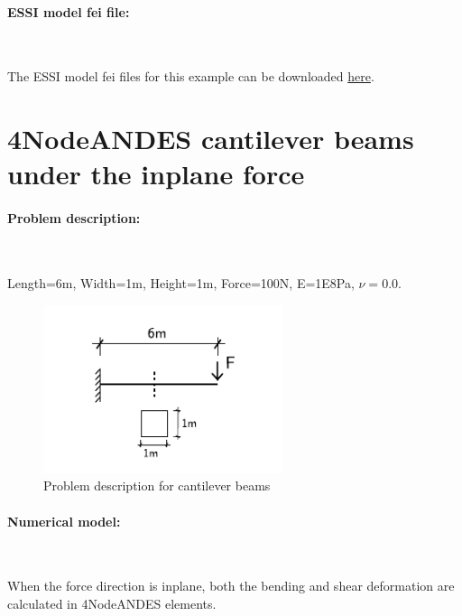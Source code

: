 \documentclass[fleqn,11pt]{article}
\begin{document}
\paragraph{ESSI model fei file: } ~



The ESSI model fei files for this example can be downloaded \href{https://github.com/yuan-energy/Real-ESSI-Examples/blob/master/model_fei_file/ANDESshell_cantilever_perpendicular_to_plane/ANDESshell_cantilever_perpendicular_to_plane.tgz?raw=true}{here}.








\newpage
\section{4NodeANDES cantilever beams under the inplane force}

\paragraph{Problem description:} ~

Length=6m, Width=1m, Height=1m, Force=100N, E=1E8Pa, $\nu=0.0$. 

\begin{figure}[H]
  \centering
  \includegraphics[width=7cm]{../Figure-files/cantilever_6.pdf}
  \caption{Problem description for cantilever beams}
  \label{fig Problem description for cantilever 4 2}
\end{figure}

\paragraph{Numerical model:} ~

When the force direction is inplane, both the bending and shear deformation are calculated in 4NodeANDES elements. 
\end{document}
